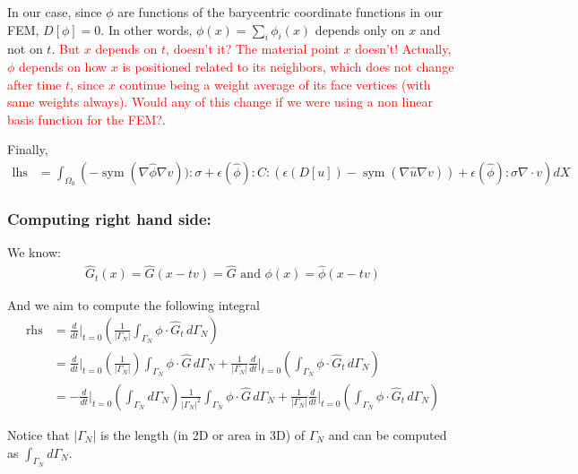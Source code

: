 \documentclass[11pt]{article}
\DeclareMathOperator{\sym}{sym}
\DeclareMathOperator{\lhs}{lhs}
\DeclareMathOperator{\rhs}{rhs}
\begin{document}
In our case, since $\phi$ are functions of the barycentric coordinate functions in our FEM, $D[\phi] = 0$. In other words, $\phi(x) = \sum_i \phi_i(x)$ depends only on $x$ and not on $t$. \textcolor{red}{But $x$ depends on $t$, doesn't it? The material point $x$ doesn't! Actually, $\phi$ depends on how $x$ is positioned related to its neighbors, which does not change after time $t$, since $x$ continue being a weight average of its face vertices (with same weights always). Would any of this change if we were using a non linear basis function for the FEM?}.

Finally,
\begin{align*}
  \lhs &= \int_{\Omega_0} \left(- \sym(\nabla \hat \phi \nabla v)):\sigma + \epsilon(\hat \phi):C:(\epsilon(D[ u])  - \sym(\nabla \hat u \nabla v)) + \epsilon(\hat \phi): \sigma \nabla \cdot v \right) dX
\end{align*}

\subsubsection{Computing right hand side:}
We know:
\begin{align*}
  \hat G_t(x) = \hat G(x - tv) = \hat G \text{ and } \phi(x) = \hat \phi(x - tv)  
\end{align*}

And we aim to compute the following integral
\begin{align*}
  \rhs &= \frac{d}{dt} \Big|_{t=0} \left( \frac{1}{|\Gamma_N|} \int_{\Gamma_N} \phi \cdot \hat G_t\, d\Gamma_N\right)\\ 
  &= \frac{d}{dt} \Big|_{t=0} \left( \frac{1}{|\Gamma_N|} \right) \int_{\Gamma_N} \phi \cdot \hat G\, d\Gamma_N  + \frac{1}{|\Gamma_N|} \frac{d}{dt} \Big|_{t=0} \left( \int_{\Gamma_N} \phi \cdot \hat G_t\, d\Gamma_N \right)\\
  &= -\frac{d}{dt} \Big|_{t=0} \left( \int_{\Gamma_N} d\Gamma_N \right) \frac{1}{|\Gamma_N|^2} \int_{\Gamma_N} \phi \cdot \hat G\, d\Gamma_N  + \frac{1}{|\Gamma_N|} \frac{d}{dt} \Big|_{t=0} \left( \int_{\Gamma_N} \phi \cdot \hat G_t\, d\Gamma_N \right)
\end{align*} 

Notice that $|\Gamma_N|$ is the length (in 2D or area in 3D) of $\Gamma_N$ and can be computed as $\int_{\Gamma_N} d\Gamma_N$.
\end{document}

